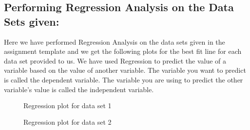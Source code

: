 \documentclass[12pt,a4paper]{article}
\begin{document}
\subsection{Performing Regression Analysis on the Data Sets given:}
Here we have performed Regression Analysis on the data sets given in the assignment template and we get the following plots for the best fit line for each data set provided to us. We have used Regression to predict the value of a variable based on the value of another variable. The variable you want to predict is called the dependent variable. The variable you are using to predict the other variable's value is called the independent variable.
\begin{figure}[!ht]
	\begin{center}
	\end{center}
	\caption{Regression plot for data set 1}
	\label{Regression plot for data set 1}
\end{figure}
\begin{figure}[!ht]
	\begin{center}
	\end{center}
	\caption{Regression plot for data set 2}
	\label{Regression plot for data set 2}
\end{figure}
\end{document}
